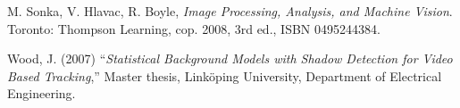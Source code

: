 \begin{thebibliography}{9}

	M. Sonka, V. Hlavac, R. Boyle,
	\emph{Image Processing, Analysis, and Machine Vision}.\\
	Toronto: Thompson Learning,
	cop. 2008, 3rd ed.,
	ISBN 0495244384.

	Wood, J. (2007)
	``\textit{Statistical Background Models with Shadow Detection for Video Based Tracking},''
	Master thesis, Linköping University, Department of Electrical Engineering.	



\end{thebibliography}